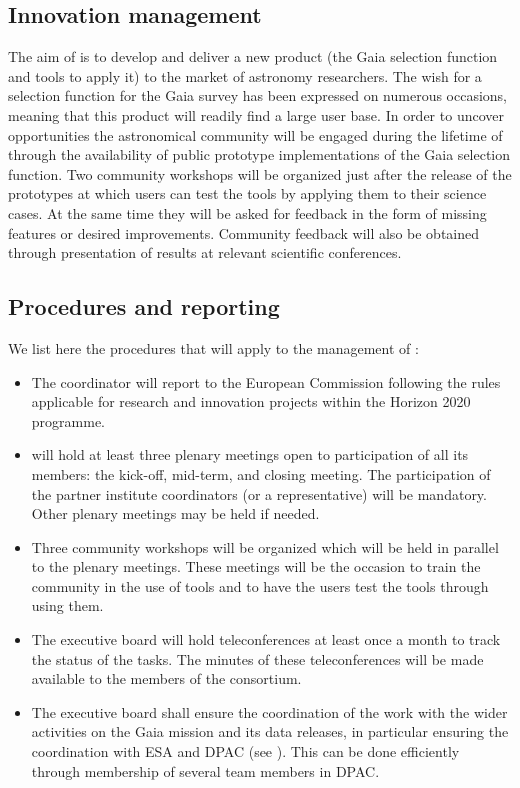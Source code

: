 \subsection{Innovation management}
\label{sec:innovationmgmt}

The aim of {\acro} is to develop and deliver a new product (the Gaia selection function and tools to apply it) to the market of astronomy researchers. The wish for a selection function for the Gaia survey has been expressed on numerous occasions, meaning that this product will readily find a large user base. In order to uncover opportunities the astronomical community will be engaged during the lifetime of {\acro} through the availability of public prototype implementations of the Gaia selection function. Two community workshops will be organized just after the release of the prototypes at which users can test the tools by applying them to their science cases. At the same time they will be asked for feedback in the form of missing features or desired improvements. Community feedback will also be obtained through presentation of {\acro} results at relevant scientific conferences.

\subsection{Procedures and reporting}
\label{sec:procedures}

We list here the procedures that will apply to the management of {\acro}:
\begin{itemize}
    \item The {\acro} coordinator will report to the European Commission following the rules applicable for research and innovation projects within the Horizon 2020 programme.
    \item {\acro} will hold at least three plenary meetings open to participation of all its members: the kick-off, mid-term, and closing meeting. The participation of the partner institute coordinators (or a representative) will be mandatory. Other plenary meetings may be held if needed.
    \item Three community workshops will be organized which will be held in parallel to the plenary meetings. These meetings will be the occasion to train the community in the use of {\acro} tools and to have the users test the tools through using them.
    \item The executive board will hold teleconferences at least once a month to track the status of the tasks. The minutes of these teleconferences will be made available to the members of the consortium.
    \item The executive board shall ensure the coordination of the {\acro} work with the wider activities on the Gaia mission and its data releases, in particular ensuring the coordination with ESA and DPAC (see ). This can be done efficiently through membership of several {\acro} team members in DPAC.
\end{itemize}

